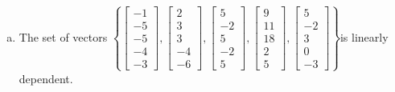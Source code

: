 \begin{exerciseAnswer}
\begin{enumerate}[(a)]
\item  The set of vectors \( \left\{ \left[\begin{array}{c}
-1 \\
-5 \\
-5 \\
-4 \\
-3
\end{array}\right] , \left[\begin{array}{c}
2 \\
3 \\
3 \\
-4 \\
-6
\end{array}\right] , \left[\begin{array}{c}
5 \\
-2 \\
5 \\
-2 \\
5
\end{array}\right] , \left[\begin{array}{c}
9 \\
11 \\
18 \\
2 \\
5
\end{array}\right] , \left[\begin{array}{c}
5 \\
-2 \\
3 \\
0 \\
-3
\end{array}\right] \right\} \)is linearly dependent.
\end{enumerate}
    
\end{exerciseAnswer}
    
